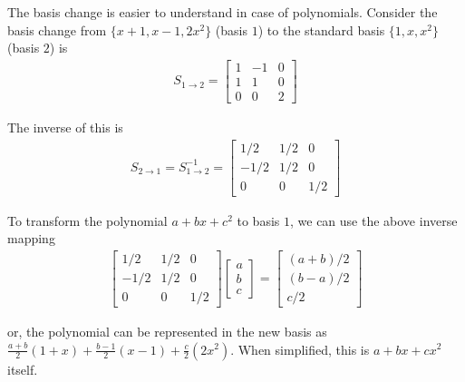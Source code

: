 \documentclass[../../linear_algebra.tex]{subfiles}
\begin{document}
The basis change is easier to understand in case of polynomials. Consider the basis change from $\{x+1, x-1, 2x^{2}\}$ (basis $1$) to the standard basis $\{ 1, x, x^{2} \}$ (basis $2$) is
\begin{align*}
    S_{1 \to 2} = \begin{bmatrix}
        1 &-1 &0\\
        1 &1 &0\\
        0 &0 &2
    \end{bmatrix}
\end{align*}

The inverse of this is
\begin{align*}
    S_{2 \to 1} = S_{1 \to 2}^{-1} = \begin{bmatrix}
        1/2 &1/2 &0\\
        -1/2 &1/2 &0\\
        0 &0 &1/2
    \end{bmatrix}
\end{align*}

To transform the polynomial $a + bx + c^{2}$ to basis $1$, we can use the above inverse mapping
\begin{align*}
    \begin{bmatrix}
        1/2 &1/2 &0\\
        -1/2 &1/2 &0\\
        0 &0 &1/2
    \end{bmatrix} \begin{bmatrix}
        a\\ b\\ c
    \end{bmatrix} =
    \begin{bmatrix}
        (a+b)/2\\ (b-a)/2\\ c/2
    \end{bmatrix}
\end{align*}

or, the polynomial can be represented in the new basis as $\frac{a+b}{2} (1+x) + \frac{b-1}{2}(x-1) + \frac{c}{2}(2x^{2})$. When simplified, this is $a + bx + cx^{2}$ itself.
\end{document}
